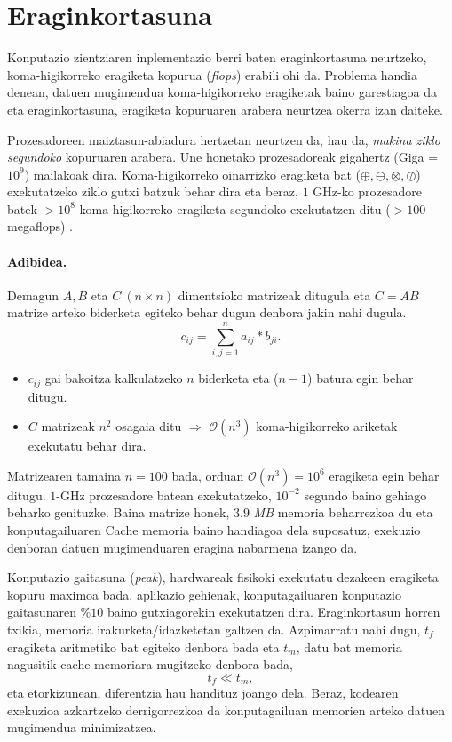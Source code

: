 \section{Eraginkortasuna}

Konputazio zientziaren inplementazio berri baten eraginkortasuna neurtzeko, koma-higikorreko eragiketa kopurua (\emph{flops}) erabili ohi da. Problema handia denean, datuen mugimendua koma-higikorreko eragiketak baino garestiagoa da eta eraginkortasuna, eragiketa kopuruaren arabera neurtzea okerra izan daiteke. 

Prozesadoreen maiztasun-abiadura hertzetan neurtzen da, hau da,  \emph{makina ziklo segundoko} kopuruaren arabera. Une honetako prozesadoreak gigahertz (Giga = $10^9$) mailakoak dira. Koma-higikorreko oinarrizko eragiketa bat ($\oplus,\ominus,\otimes,\oslash$) exekutatzeko  ziklo gutxi batzuk behar dira eta beraz, $1$ GHz-ko prozesadore batek
$>10^8$ koma-higikorreko eragiketa segundoko exekutatzen ditu ($>100$ megaflops) \cite{Pacheco2011}.

\paragraph*{\textbf{Adibidea}.} 
Demagun $A,B$ eta $C \ (n \times n)$ dimentsioko matrizeak ditugula eta $C=AB$ matrize arteko biderketa egiteko behar dugun denbora jakin nahi dugula.
\begin{equation*}
c_{ij}=\sum\limits_{i,j=1}^{n} a_{ij}*b_{ji}.
\end{equation*}

\begin{itemize}
\item $c_{ij}$ gai bakoitza kalkulatzeko $n$ biderketa eta ($n-1$) batura egin behar ditugu.
\item $C$ matrizeak $n^2$ osagaia ditu $\Rightarrow$ $\mathcal{O}(n^3)$ koma-higikorreko ariketak exekutatu behar dira.
\end{itemize}

Matrizearen tamaina $n=100$ bada,  orduan  $\mathcal{O}(n^3)=10^{6}$ eragiketa egin behar ditugu. $1$-GHz prozesadore batean exekutatzeko, $10^{-2}$ segundo baino gehiago beharko genituzke. Baina matrize honek,  $3.9$ \emph{MB} memoria beharrezkoa du eta  konputagailuaren Cache memoria baino handiagoa dela suposatuz, exekuzio denboran datuen mugimenduaren eragina nabarmena izango da. 

Konputazio gaitasuna (\emph{peak}), hardwareak fisikoki exekutatu dezakeen eragiketa kopuru maximoa bada, aplikazio gehienak, konputagailuaren konputazio gaitasunaren  $\%10$ baino gutxiagorekin exekutatzen dira.  Eraginkortasun horren txikia, memoria irakurketa/idazketetan galtzen da. Azpimarratu nahi dugu, $t_f$ eragiketa aritmetiko bat egiteko denbora bada eta $t_m$, datu bat memoria nagusitik cache memoriara mugitzeko denbora bada,
\begin{equation*}
 t_f \ll t_m,
\end{equation*}
eta etorkizunean, diferentzia hau handituz joango dela. Beraz, kodearen exekuzioa azkartzeko derrigorrezkoa da konputagailuan memorien arteko datuen mugimendua minimizatzea.
       
